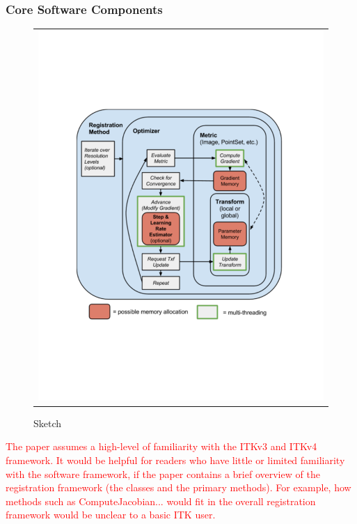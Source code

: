 \documentclass{frontiersSCNS}
\begin{document}
\subsubsection{Core Software Components}
\begin{figure}[t]
\begin{center}
\begin{tabular}{c}
\includegraphics[width=5in]{figs/software_design.pdf}
\end{tabular}
\caption{\baselineskip 12pt \small Sketch}
\label{fig:softw}
\end{center}
\end{figure}

\textcolor{red}{The paper assumes a high-level of familiarity with the ITKv3 and ITKv4 framework. It would be helpful for readers who have little or limited familiarity with the software framework, if the paper contains a brief overview of the registration framework (the classes and the primary methods). For example, how methods such as ComputeJacobian... would fit in the overall registration framework would be unclear to a basic ITK user.}
\end{document}
